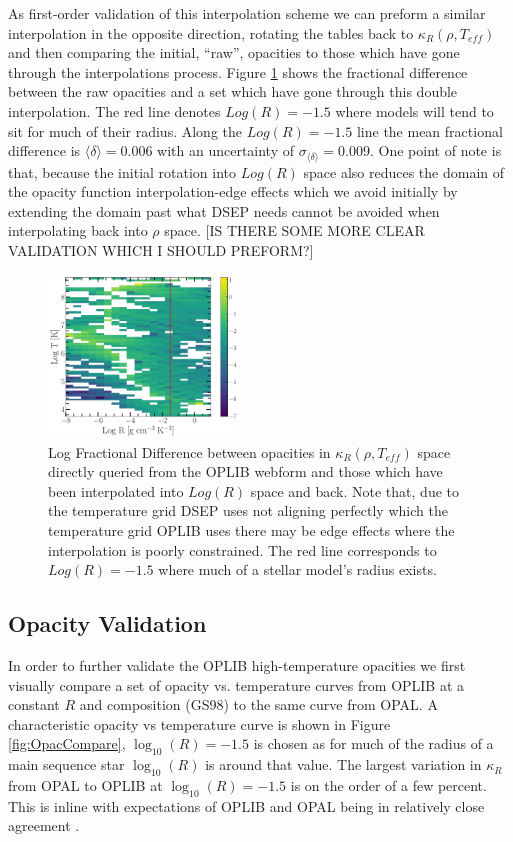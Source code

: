 As first-order validation of this interpolation scheme we can preform a similar
interpolation in the opposite direction, rotating the tables back to
$\kappa_{R}(\rho, T_{eff})$ and then comparing the initial, ``raw'', opacities
to those which have gone through the interpolations process. Figure
\ref{fig:fracdiff} shows the fractional difference between the raw opacities
and a set which have gone through this double interpolation. The red line
denotes $Log(R)=-1.5$ where models will tend to sit for much of their radius.
Along the $Log(R)=-1.5$ line the mean fractional difference is $\langle \delta
\rangle = 0.006$ with an uncertainty of $\sigma_{\langle\delta\rangle} =
0.009$. One point of note is that, because the initial rotation into $Log(R)$
space also reduces the domain of the opacity function interpolation-edge
effects which we avoid initially by extending the domain past what DSEP needs
cannot be avoided when interpolating back into $\rho$ space. {\color{red} [IS
THERE SOME MORE CLEAR VALIDATION WHICH I SHOULD PREFORM?]}

\begin{figure}
	\centering
	\includegraphics[width=0.45\textwidth]{src/figures/FractionalDifference.pdf}
	\caption{Log Fractional Difference between opacities in $\kappa_{R}(\rho,
	T_{eff})$ space directly queried from the OPLIB webform and those which
	have been interpolated into $Log(R)$ space and back. Note that, due to the
	temperature grid DSEP uses not aligning perfectly which the temperature
	grid OPLIB uses there may be edge effects where the interpolation is poorly
	constrained. The red line corresponds to $Log(R) = -1.5$ where much of a
	stellar model's radius exists.}
	\label{fig:fracdiff}
\end{figure}

\subsection{Opacity Validation}
In order to further validate the OPLIB high-temperature opacities we first visually
compare a set of opacity vs. temperature curves from OPLIB at a constant $R$
and \citet{Grevesse1998} composition (GS98) to the same curve from OPAL. A
characteristic opacity vs temperature curve is shown in Figure
\ref{fig:OpacCompare}, $\log _{10}(R) = -1.5$ is chosen as for much of the
radius of a main sequence star $\log _{10}(R)$ is around that value. The
largest variation in $\kappa_{R}$ from OPAL to OPLIB at $\log _{10}(R)=-1.5$ is
on the order of a few percent. This is inline with expectations of OPLIB and OPAL
being in relatively close agreement \citep{Colgan2016}.

